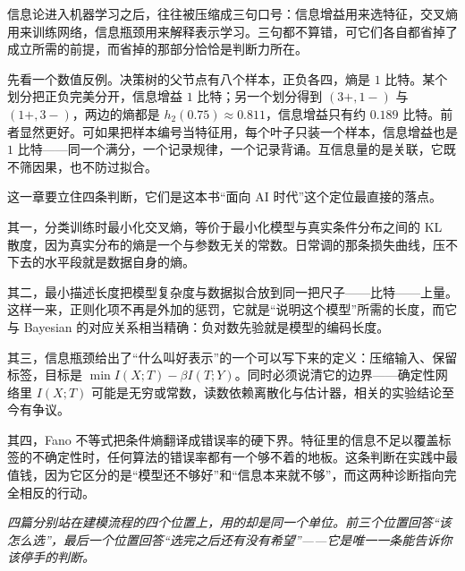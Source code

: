 信息论进入机器学习之后，往往被压缩成三句口号：信息增益用来选特征，交叉熵用来训练网络，信息瓶颈用来解释表示学习。三句都不算错，可它们各自都省掉了成立所需的前提，而省掉的那部分恰恰是判断力所在。

先看一个数值反例。决策树的父节点有八个样本，正负各四，熵是 \(1\) 比特。某个划分把正负完美分开，信息增益 \(1\) 比特；另一个划分得到 \((3+,1-)\) 与 \((1+,3-)\)，两边的熵都是 \(h_2(0.75)\approx0.811\)，信息增益只有约 \(0.189\) 比特。前者显然更好。可如果把样本编号当特征用，每个叶子只装一个样本，信息增益也是 \(1\) 比特——同一个满分，一个记录规律，一个记录背诵。互信息量的是关联，它既不筛因果，也不防过拟合。

这一章要立住四条判断，它们是这本书``面向 AI 时代''这个定位最直接的落点。

其一，分类训练时最小化交叉熵，等价于最小化模型与真实条件分布之间的 KL 散度，因为真实分布的熵是一个与参数无关的常数。日常调的那条损失曲线，压不下去的水平段就是数据自身的熵。

其二，最小描述长度把模型复杂度与数据拟合放到同一把尺子——比特——上量。这样一来，正则化项不再是外加的惩罚，它就是``说明这个模型''所需的长度，而它与 Bayesian 的对应关系相当精确：负对数先验就是模型的编码长度。

其三，信息瓶颈给出了``什么叫好表示''的一个可以写下来的定义：压缩输入、保留标签，目标是 \(\min I(X;T)-\beta I(T;Y)\)。同时必须说清它的边界——确定性网络里 \(I(X;T)\) 可能是无穷或常数，读数依赖离散化与估计器，相关的实验结论至今有争议。

其四，Fano 不等式把条件熵翻译成错误率的硬下界。特征里的信息不足以覆盖标签的不确定性时，任何算法的错误率都有一个够不着的地板。这条判断在实践中最值钱，因为它区分的是``模型还不够好''和``信息本来就不够''，而这两种诊断指向完全相反的行动。

\begin{center}

\emph{四篇分别站在建模流程的四个位置上，用的却是同一个单位。前三个位置回答``该怎么选''，最后一个位置回答``选完之后还有没有希望''——它是唯一一条能告诉你该停手的判断。}
\end{center}

